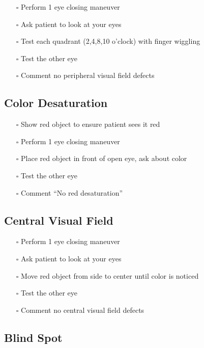 \documentclass[
  13.5pt,
  a4paper,
  DIV=11,
  numbers=noendperiod]{scrreprt}
\providecommand{\tightlist}{%
  \setlength{\itemsep}{0pt}\setlength{\parskip}{0pt}}
\begin{document}
\begin{itemize}
\tightlist
\item[$\square$]
  Perform 1 eye closing maneuver
\item[$\square$]
  Ask patient to look at your eyes
\item[$\square$]
  Test each quadrant (2,4,8,10 o'clock) with finger wiggling
\item[$\square$]
  Test the other eye
\item[$\square$]
  Comment no peripheral visual field defects
\end{itemize}

\subsection{Color Desaturation}\label{color-desaturation}

\begin{itemize}
\tightlist
\item[$\square$]
  Show red object to ensure patient sees it red
\item[$\square$]
  Perform 1 eye closing maneuver
\item[$\square$]
  Place red object in front of open eye, ask about color
\item[$\square$]
  Test the other eye
\item[$\square$]
  Comment ``No red desaturation''
\end{itemize}

\subsection{Central Visual Field}\label{central-visual-field}

\begin{itemize}
\tightlist
\item[$\square$]
  Perform 1 eye closing maneuver
\item[$\square$]
  Ask patient to look at your eyes
\item[$\square$]
  Move red object from side to center until color is noticed
\item[$\square$]
  Test the other eye
\item[$\square$]
  Comment no central visual field defects
\end{itemize}

\subsection{Blind Spot}\label{blind-spot}
\end{document}
